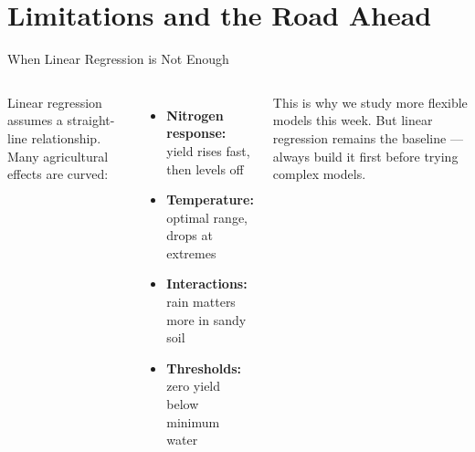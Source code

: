 \documentclass[aspectratio=169,10pt]{beamer}
\begin{document}
\section{Limitations and the Road Ahead}

\begin{frame}{When Linear Regression is Not Enough}
  \begin{columns}
      Linear regression assumes a straight-line relationship.
      Many agricultural effects are curved:
      \vspace{0.2cm}
      \begin{itemize}
        \setlength\itemsep{0.25cm}
        \item \textbf{Nitrogen response:} yield rises fast, then levels off
        \item \textbf{Temperature:} optimal range, drops at extremes
        \item \textbf{Interactions:} rain matters more in sandy soil
        \item \textbf{Thresholds:} zero yield below minimum water
      \end{itemize}
      \vspace{0.3cm}
      \begin{tcolorbox}[keybox]
        \small This is why we study more flexible models this week.
        But linear regression remains the baseline --- always build it first
        before trying complex models.
      \end{tcolorbox}
  \end{columns}
\end{frame}
\end{document}
